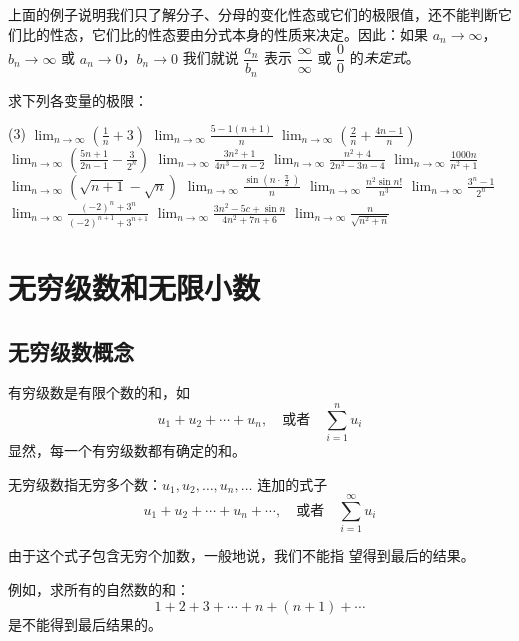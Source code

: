 {\linespread{1.6}\selectfont 上面的例子说明我们只了解分子、分母的变化性态或它们的极限值，还不能判断它们比的性态，它们比的性态要由分式本身的性质来决定。因此：如果 $a_n\to\infty$，$b_n\to\infty$ 或 $a_n\to 0$，$b_n\to 0$ 我们就说 $\dfrac{a_n}{b_n}$ 表示 $\dfrac{\infty}{\infty}$ 或 $\dfrac{0}{0}$ 的\emph{未定式}。\par}

\begin{Exercise}

求下列各变量的极限：
\begin{tasks}(3)
\task $\displaystyle \lim_{n\to\infty}\left(\frac{1}{n}+3\right)$
\task $\displaystyle \lim_{n\to\infty} \frac{5-1(n+1)}{n}$ 
\task $\displaystyle \lim_{n\to\infty}\left(\frac{2}{n}+\frac{4 n-1}{n}\right)$
\task $\displaystyle \lim_{n\to\infty}\left(\frac{5 n+1}{2 n-1}-\frac{3}{2^{n}}\right)$
\task $\displaystyle \lim_{n\to\infty} \frac{3 n^{2}+1}{4 n^{3}-n-2} $
\task $\displaystyle \lim_{n\to\infty} \frac{n^{2}+4}{2 n^{2}-3 n-4}$
\task $\displaystyle \lim_{n\to\infty} \frac{1000 n}{n^{2}+1}$
\task $\displaystyle \lim_{n\to\infty}(\sqrt{n+1}-\sqrt{n})$
\task $\displaystyle \lim_{n\to\infty} \frac{\sin \left(n \cdot \frac{\uppi}{2}\right)}{n}$
\task $\displaystyle \lim_{n\to\infty} \frac{n^{2} \sin n !}{n^{3}}$
\task $\displaystyle \lim_{n\to\infty} \frac{3^{n}-1}{2^{n}}$
\task $\displaystyle \lim_{n\to\infty} \frac{(-2)^{n}+3^{n}}{(-2)^{n+1}+3^{n+1}}$ 
\task $\displaystyle \lim_{n\to\infty} \frac{3n^2-5c+\sin n}{4n^2+7n+6}$ 
\task $\displaystyle \lim_{n\to\infty} \frac{n}{\sqrt{n^2+n}}$ 
\end{tasks}
\end{Exercise}    

\section{无穷级数和无限小数}
\subsection{无穷级数概念}

有穷级数是有限个数的和，如
\[ u_1+u_2+\cdots+u_n,\quad \text{或者}\quad \sum^n_{i=1}u_i\]
显然，每一个有穷级数都有确定的和。

无穷级数指无穷多个数：$u_1,u_2,\ldots,u_n,\ldots$ 连加的式子
\[u_1+u_2+\cdots+u_n+\cdots,\quad \text{或者}\quad \sum^{\infty}_{i=1}u_i\]

由于这个式子包含无穷个加数，一般地说，我们不能指
望得到最后的结果。

例如，求所有的自然数的和：
\[1+2+3+\cdots+n+(n+1)+\cdots\]
是不能得到最后结果的。


